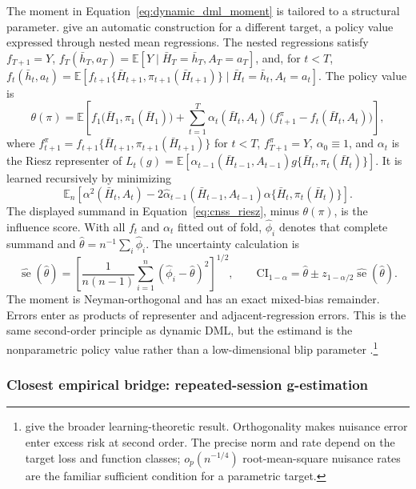 The moment in Equation~\eqref{eq:dynamic_dml_moment} is tailored to a structural parameter. \citet{chernozhukov2023automatic} give an automatic construction for a different target, a policy value expressed through nested mean regressions. The nested regressions satisfy $f_{T+1}=Y$, $f_T(\bar h_T,a_T)=\mathbb E[Y\mid\bar H_T=\bar h_T,A_T=a_T]$, and, for $t<T$, $f_t(\bar h_t,a_t)=\mathbb E[f_{t+1}\{\bar H_{t+1},\pi_{t+1}(\bar H_{t+1})\}\mid\bar H_t=\bar h_t,A_t=a_t]$. The policy value is
\begin{equation}
\theta(\pi) = \mathbb{E}\!\left[f_1\bigl(\bar H_1, \pi_1(\bar H_1)\bigr) + \sum_{t=1}^{T} \alpha_t(\bar H_t,A_t)\,\bigl(f_{t+1}^{\pi}-f_t(\bar H_t,A_t)\bigr)\right],
\label{eq:cnss_riesz}
\end{equation}
where $f_{t+1}^{\pi}=f_{t+1}\{\bar H_{t+1},\pi_{t+1}(\bar H_{t+1})\}$ for $t<T$, $f_{T+1}^{\pi}=Y$, $\alpha_0\equiv1$, and $\alpha_t$ is the Riesz representer of $L_t(g)=\mathbb E[\alpha_{t-1}(\bar H_{t-1},A_{t-1})g\{\bar H_t,\pi_t(\bar H_t)\}]$. It is learned recursively by minimizing
\[
\mathbb E_n\!\left[\alpha^2(\bar H_t,A_t)-2\hat\alpha_{t-1}(\bar H_{t-1},A_{t-1})\alpha\{\bar H_t,\pi_t(\bar H_t)\}\right].
\]
The displayed summand in Equation~\eqref{eq:cnss_riesz}, minus $\theta(\pi)$, is the influence score. With all $f_t$ and $\alpha_t$ fitted out of fold, $\hat\phi_i$ denotes that complete summand and $\hat\theta=n^{-1}\sum_i\hat\phi_i$. The uncertainty calculation is
\[
\widehat{\operatorname{se}}(\hat\theta)
=\left[
\frac{1}{n(n-1)}
\sum_{i=1}^n(\hat\phi_i-\hat\theta)^2
\right]^{1/2},
\qquad
\mathrm{CI}_{1-\alpha}
=\hat\theta\pm z_{1-\alpha/2}\widehat{\operatorname{se}}(\hat\theta).
\]
The moment is Neyman-orthogonal and has an exact mixed-bias remainder. Errors enter as products of representer and adjacent-regression errors. This is the same second-order principle as dynamic DML, but the estimand is the nonparametric policy value rather than a low-dimensional blip parameter \citep{chernozhukov2023automatic}.\footnote{\citet{fosterSyrgkanis2023orthogonal} give the broader learning-theoretic result. Orthogonality makes nuisance error enter excess risk at second order. The precise norm and rate depend on the target loss and function classes; $o_p(n^{-1/4})$ root-mean-square nuisance rates are the familiar sufficient condition for a parametric target.}

\subsubsection*{Closest empirical bridge: repeated-session g-estimation}

